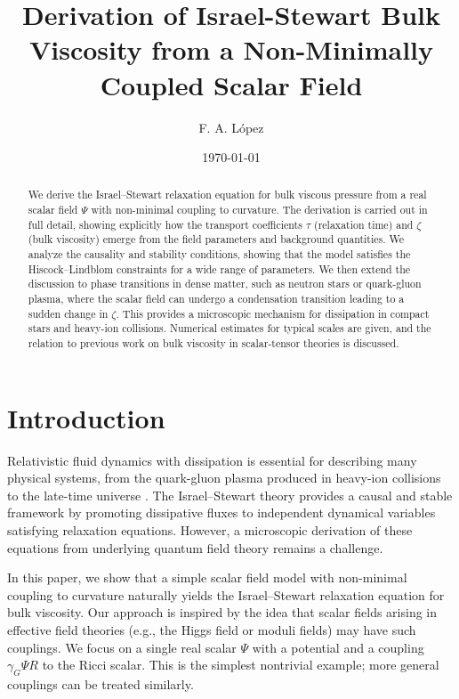 \documentclass[aps,prd,reprint,superscriptaddress,floatfix]{revtex4-2}
\begin{document}
\title{Derivation of Israel-Stewart Bulk Viscosity from a Non-Minimally Coupled Scalar Field}

\author{F. A. L\'opez}

\date{\today}

\begin{abstract}
We derive the Israel--Stewart relaxation equation for bulk viscous pressure from a real scalar field $\Psi$ with non-minimal coupling to curvature. The derivation is carried out in full detail, showing explicitly how the transport coefficients $\tau$ (relaxation time) and $\zeta$ (bulk viscosity) emerge from the field parameters and background quantities. We analyze the causality and stability conditions, showing that the model satisfies the Hiscock--Lindblom constraints for a wide range of parameters. We then extend the discussion to phase transitions in dense matter, such as neutron stars or quark-gluon plasma, where the scalar field can undergo a condensation transition leading to a sudden change in $\zeta$. This provides a microscopic mechanism for dissipation in compact stars and heavy-ion collisions. Numerical estimates for typical scales are given, and the relation to previous work on bulk viscosity in scalar-tensor theories is discussed.
\end{abstract}

\maketitle

\section{Introduction}
\label{sec:intro}

Relativistic fluid dynamics with dissipation is essential for describing many physical systems, from the quark-gluon plasma produced in heavy-ion collisions \cite{Romatschke} to the late-time universe \cite{Zimdahl}. The Israel--Stewart theory \cite{IsraelStewart} provides a causal and stable framework by promoting dissipative fluxes to independent dynamical variables satisfying relaxation equations. However, a microscopic derivation of these equations from underlying quantum field theory remains a challenge.

In this paper, we show that a simple scalar field model with non-minimal coupling to curvature naturally yields the Israel--Stewart relaxation equation for bulk viscosity. Our approach is inspired by the idea that scalar fields arising in effective field theories (e.g., the Higgs field or moduli fields) may have such couplings. We focus on a single real scalar $\Psi$ with a potential and a coupling $\gamma_G\Psi R$ to the Ricci scalar. This is the simplest nontrivial example; more general couplings can be treated similarly.
\end{document}
